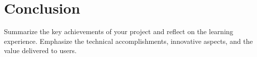 \section{Conclusion}
Summarize the key achievements of your project and reflect on the learning experience. Emphasize the technical accomplishments, innovative aspects, and the value delivered to users.
